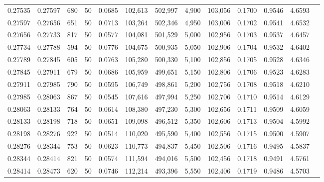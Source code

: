 \begin{tabular}{rrrrrrrrrrrrr}
0.27535 & 0.27597 &   680 &  50 &                                     0.0685 & 102,613 & 502,997 &   4,900 & 103,056 & 0.1700 & 0.9546 & 4.6593 \\
0.27597 & 0.27656 &   651 &  50 &                                     0.0713 & 103,264 & 502,346 &   4,950 & 103,006 & 0.1702 & 0.9541 & 4.6532 \\
0.27656 & 0.27733 &   817 &  50 &                                     0.0577 & 104,081 & 501,529 &   5,000 & 102,956 & 0.1703 & 0.9537 & 4.6457 \\
0.27734 & 0.27788 &   594 &  50 &                                     0.0776 & 104,675 & 500,935 &   5,050 & 102,906 & 0.1704 & 0.9532 & 4.6402 \\
0.27789 & 0.27845 &   605 &  50 &                                     0.0763 & 105,280 & 500,330 &   5,100 & 102,856 & 0.1705 & 0.9528 & 4.6346 \\
0.27845 & 0.27911 &   679 &  50 &                                     0.0686 & 105,959 & 499,651 &   5,150 & 102,806 & 0.1706 & 0.9523 & 4.6283 \\
0.27911 & 0.27985 &   790 &  50 &                                     0.0595 & 106,749 & 498,861 &   5,200 & 102,756 & 0.1708 & 0.9518 & 4.6210 \\
0.27985 & 0.28063 &   867 &  50 &                                     0.0545 & 107,616 & 497,994 &   5,250 & 102,706 & 0.1710 & 0.9514 & 4.6129 \\
0.28063 & 0.28133 &   764 &  50 &                                     0.0614 & 108,380 & 497,230 &   5,300 & 102,656 & 0.1711 & 0.9509 & 4.6059 \\
0.28133 & 0.28198 &   718 &  50 &                                     0.0651 & 109,098 & 496,512 &   5,350 & 102,606 & 0.1713 & 0.9504 & 4.5992 \\
0.28198 & 0.28276 &   922 &  50 &                                     0.0514 & 110,020 & 495,590 &   5,400 & 102,556 & 0.1715 & 0.9500 & 4.5907 \\
0.28276 & 0.28344 &   753 &  50 &                                     0.0623 & 110,773 & 494,837 &   5,450 & 102,506 & 0.1716 & 0.9495 & 4.5837 \\
0.28344 & 0.28414 &   821 &  50 &                                     0.0574 & 111,594 & 494,016 &   5,500 & 102,456 & 0.1718 & 0.9491 & 4.5761 \\
0.28414 & 0.28473 &   620 &  50 &                                     0.0746 & 112,214 & 493,396 &   5,550 & 102,406 & 0.1719 & 0.9486 & 4.5703 \\

\end{tabular}
